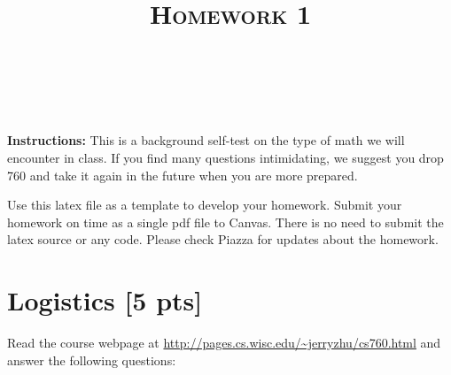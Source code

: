 \documentclass[a4paper]{article}
\title{\textsc{Homework 1}} %
\author{
\red{$$AKASH SHARMA$$} \\
\red{$$9081731771$$}\\
}
\date{}
\theoremstyle{definition}
\begin{document}
\maketitle 


\textbf{Instructions:} 
This is a background self-test on the type of math we will encounter in class. If you find many questions intimidating, we suggest you drop 760 and take it again in the future when you are more prepared.

Use this latex file as a template to develop your homework.
Submit your homework on time as a single pdf file to Canvas.
There is no need to submit the latex source or any code.
Please check Piazza for updates about the homework.


\section{Logistics [5 pts]}
Read the course webpage at \url{http://pages.cs.wisc.edu/~jerryzhu/cs760.html} and answer the following questions:
\end{document}
